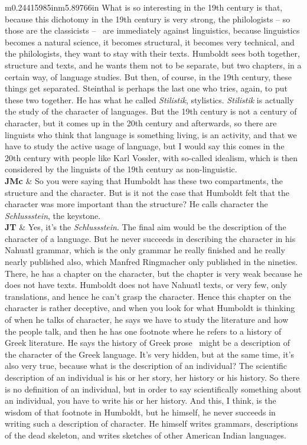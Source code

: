 \documentclass[12pt]{article}
\begin{document}
\begin{flushleft}
\begin{supertabular}{m{0.24415985in}m{5.89766in}}
What is so interesting in the 19th century is that, because this dichotomy in the 19th century is very strong, the philologists – so those are the classicists – \ are immediately against linguistics, because linguistics becomes a natural science, it becomes structural, it becomes very technical, and the philologists, they want to stay with their texts. Humboldt sees both together, structure and texts, and he wants them not to be separate, but two chapters, in a certain way, of language studies. But then, of course, in the 19th century, these things get separated. Steinthal is perhaps the last one who tries, again, to put these two together. He has what he called \textit{Stilistik}, stylistics. \textit{Stilistik} is actually the study of the character of languages. But the 19th century is not a century of character, but it comes up in the 20th century and afterwards, so there are linguists who think that language is something living, is an activity, and that we have to study the active usage of language, but I would say this comes in the 20th century with people like Karl Vossler, with so-called idealism, which is then considered by the linguists of the 19th century as non-linguistic.\\
\textbf{JMc}\newline
 &
So you were saying that Humboldt has these two compartments, the structure and the character. But is it not the case that Humboldt felt that the character was more important than the structure? He calls character the \textit{Schlussstein}, the keystone.\\
\textbf{JT}\newline
 &
Yes, it’s the \textit{Schlussstein}. The final aim would be the description of the character of a language. But he never succeeds in describing the character in his Nahuatl grammar, which is the only grammar he really finished and he really nearly published also, which Manfred Ringmacher only published in the nineties. There, he has a chapter on the character, but the chapter is very weak because he does not have texts. Humboldt does not have Nahuatl texts, or very few, only translations, and hence he can’t grasp the character. Hence this chapter on the character is rather deceptive, and when you look for what Humboldt is thinking of when he talks of character, he says we have to study the literature and how the people talk, and then he has one footnote where he refers to a history of Greek literature. He says the history of Greek prose \ might be a description of the character of the Greek language. It’s very hidden, but at the same time, it’s also very true, because what is the description of an individual? The scientific description of an individual is his or her story, her history or his history. So there is no definition of an individual, but in order to say scientifically something about an individual, you have to write his or her history. And this, I think, is the wisdom of that footnote in Humboldt, but he himself, he never succeeds in writing such a description of character. He himself writes grammars, descriptions of the dead skeleton, and writes sketches of other American Indian languages. 


\end{supertabular}
\end{flushleft}
\end{document}
